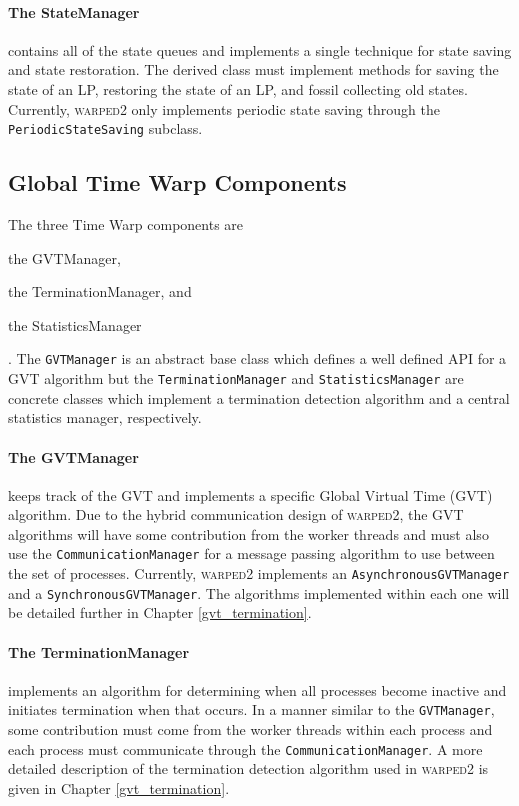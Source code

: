 \documentclass[11pt]{book}
\begin{document}
\paragraph{The StateManager} contains all of the state queues and implements a single technique
for state saving and state restoration.  The derived class must implement methods for saving the
state of an LP, restoring the state of an LP, and fossil collecting old states.  Currently,
\textsc{warped2} only implements periodic state saving through the \texttt{PeriodicStateSaving}
subclass.

\subsection{Global Time Warp Components}

The three Time Warp components are \begin{inparaenum}[(1)] \item the GVTManager, \item the
  TerminationManager, and \item the StatisticsManager \end{inparaenum}.  The \texttt{GVTManager} is
an abstract base class which defines a well defined API for a GVT algorithm but the
\texttt{TerminationManager} and \texttt{StatisticsManager} are concrete classes which implement a
termination detection algorithm and a central statistics manager, respectively.

\paragraph{The GVTManager} keeps track of the GVT and implements a specific Global Virtual Time
(GVT) algorithm.  Due to the hybrid communication design of \textsc{warped2}, the GVT algorithms
will have some contribution from the worker threads and must also use the
\texttt{CommunicationManager} for a message passing algorithm to use between the set of processes.
Currently, \textsc{warped2} implements an \texttt{AsynchronousGVTManager} and a
\texttt{SynchronousGVTManager}.  The algorithms implemented within each one will be detailed further
in Chapter \ref{gvt_termination}.

\paragraph{The TerminationManager} implements an algorithm for determining when all processes
become inactive and initiates termination when that occurs.  In a manner similar to the
\texttt{GVTManager}, some contribution must come from the worker threads within each process and
each process must communicate through the \texttt{CommunicationManager}.  A more detailed
description of the termination detection algorithm used in \textsc{warped2} is given in Chapter
\ref{gvt_termination}.
\end{document}
